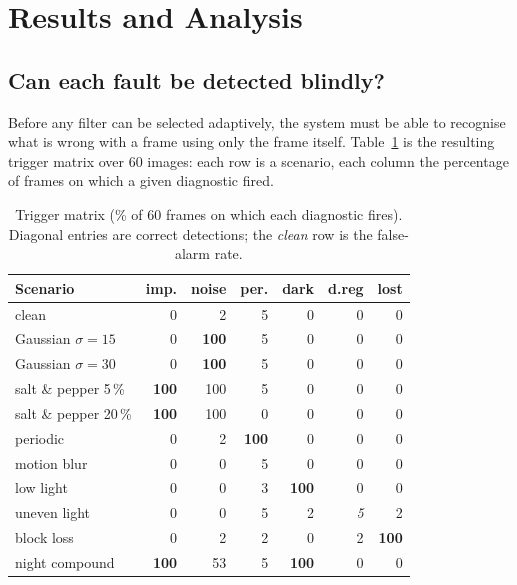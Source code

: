 \documentclass[conference,10pt]{IEEEtran}
\newcommand{\hdr}[1]{\textbf{#1}}
\begin{document}
\section{Results and Analysis}\label{sec:results}

\subsection{Can each fault be detected blindly?}\label{sec:res-diag}
Before any filter can be selected adaptively, the system must be able to
recognise what is wrong with a frame using only the frame itself.
Table~\ref{tab:trigger} is the resulting trigger matrix over 60 images: each
row is a scenario, each column the percentage of frames on which a given
diagnostic fired.

\begin{table}[!t]
\caption{Trigger matrix (\% of 60 frames on which each diagnostic fires).
Diagonal entries are correct detections; the \emph{clean} row is the
false-alarm rate.}
\label{tab:trigger}
\centering
\scriptsize
\begin{tabular}{@{}lrrrrrr@{}}
\toprule
\hdr{Scenario} & \hdr{imp.} & \hdr{noise} & \hdr{per.} & \hdr{dark} & \hdr{d.reg} & \hdr{lost} \\
\midrule
clean            & 0 & 2 & 5 & 0 & 0 & 0 \\
Gaussian $\sigma{=}15$ & 0 & \textbf{100} & 5 & 0 & 0 & 0 \\
Gaussian $\sigma{=}30$ & 0 & \textbf{100} & 5 & 0 & 0 & 0 \\
salt \& pepper 5\,\%   & \textbf{100} & 100 & 5 & 0 & 0 & 0 \\
salt \& pepper 20\,\%  & \textbf{100} & 100 & 0 & 0 & 0 & 0 \\
periodic         & 0 & 2 & \textbf{100} & 0 & 0 & 0 \\
motion blur      & 0 & 0 & 5 & 0 & 0 & 0 \\
low light        & 0 & 0 & 3 & \textbf{100} & 0 & 0 \\
uneven light     & 0 & 0 & 5 & 2 & \textit{5} & 2 \\
block loss       & 0 & 2 & 2 & 0 & 2 & \textbf{100} \\
night compound   & \textbf{100} & 53 & 5 & \textbf{100} & 0 & 0 \\
\bottomrule
\end{tabular}
\end{table}
\end{document}

